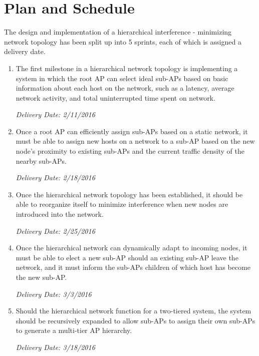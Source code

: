 \documentclass{sigcomm-alternate}
\begin{document}
\section{Plan and Schedule}



The design and implementation of a hierarchical interference - minimizing network topology has been split up into 5 sprints, each of which is assigned a delivery date. 

\begin{enumerate}
    
    \item The first milestone in a hierarchical network topology is implementing a system in which the root AP can select ideal sub-APs based on basic information about each host on the network, such as a latency, average network activity, and total uninterrupted time spent on network. 
    
    \textit{Delivery Date: 2/11/2016}

    \item Once a root AP can efficiently assign sub-APs based on a static network, it must be able to assign new hosts on a network to a sub-AP based on the new node's proximity to existing sub-APs and the current traffic density of the nearby sub-APs. 
    
    \textit{Delivery Date: 2/18/2016}

    \item Once the hierarchical network topology has been established, it should be able to reorganize itself to minimize interference when new nodes are introduced into the network. 
    
    \textit{Delivery Date: 2/25/2016}

    \item Once the hierarchical network can dynamically adapt to incoming nodes, it must be able to elect a new sub-AP should an existing sub-AP leave the network, and it must inform the sub-APs children of which host has become the new sub-AP.
    
    \textit{Delivery Date: 3/3/2016}

    \item Should the hierarchical network function for a two-tiered system, the system should be recursively expanded to allow sub-APs to assign their own sub-APs to generate a multi-tier AP hierarchy.
    
    \textit{Delivery Date: 3/18/2016}
\end{enumerate}
\end{document}

